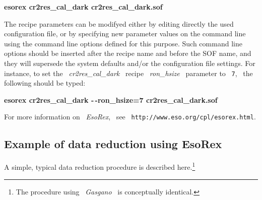\begin{description}
   {\bf esorex cr2res\_cal\_dark cr2res\_cal\_dark.sof}

The recipe parameters can be modifyed either by editing directly the 
used configuration file, or by specifying new parameter values
on the command line using the command line options defined for this
purpose. Such command line options should be inserted after the
recipe name and before the SOF name, and they will supersede the
system defaults and/or the configuration file settings. For instance, 
to set the
\ {\it cr2res\_cal\_dark} \ recipe \ {\it ron\_hsize} \ parameter to 
\ {\tt 7},
\ the following should be typed:


   {\bf esorex cr2res\_cal\_dark -\,-ron\_hsize=7 cr2res\_cal\_dark.sof}

\end{description}

For more information on \ {\it EsoRex}, \ see 
\ {\tt http://www.eso.org/cpl/esorex.html}.


\subsection{Example of data reduction using EsoRex}
\label{EXIFU}

A simple, typical data reduction procedure is described 
here.\footnote{The procedure using \ {\it Gasgano} 
\ is conceptually identical.}




